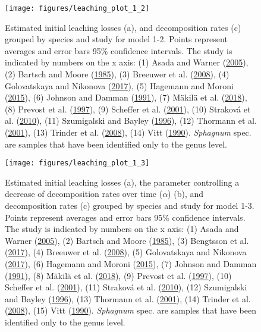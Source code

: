 \documentclass[
  12pt,
]{article}
\begin{document}
\begin{figure}[H]

{\centering \texttt{[image: figures/leaching\_plot\_1\_2]} 

}

\caption{Estimated initial leaching losses (a), and decomposition rates (c) grouped by species and study for model 1-2. Points represent averages and error bars 95\% confidence intervals. The study is indicated by numbers on the x axis: (1) Asada and Warner (\protect\hyperlink{ref-Asada.2005b}{2005}), (2) Bartsch and Moore (\protect\hyperlink{ref-Bartsch.1985}{1985}), (3) Breeuwer et al. (\protect\hyperlink{ref-Breeuwer.2008}{2008}), (4) Golovatskaya and Nikonova (\protect\hyperlink{ref-Golovatskaya.2017}{2017}), (5) Hagemann and Moroni (\protect\hyperlink{ref-Hagemann.2015}{2015}), (6) Johnson and Damman (\protect\hyperlink{ref-Johnson.1991}{1991}), (7) Mäkilä et al. (\protect\hyperlink{ref-Makila.2018}{2018}), (8) Prevost et al. (\protect\hyperlink{ref-Prevost.1997}{1997}), (9) Scheffer et al. (\protect\hyperlink{ref-Scheffer.2001}{2001}), (10) Straková et al. (\protect\hyperlink{ref-Strakova.2010}{2010}), (11) Szumigalski and Bayley (\protect\hyperlink{ref-Szumigalski.1996}{1996}), (12) Thormann et al. (\protect\hyperlink{ref-Thormann.2001}{2001}), (13) Trinder et al. (\protect\hyperlink{ref-Trinder.2008}{2008}), (14) Vitt (\protect\hyperlink{ref-Vitt.1990}{1990}). \emph{Sphagnum} spec. are samples that have been identified only to the genus level.}\label{fig:sup-out-mm-p5-1-2}
\end{figure}
\begin{figure}[H]

{\centering \texttt{[image: figures/leaching\_plot\_1\_3]} 

}

\caption{Estimated initial leaching losses (a), the parameter controlling a decrease of decomposition rates over time (\(\alpha\)) (b), and decomposition rates (c) grouped by species and study for model 1-3. Points represent averages and error bars 95\% confidence intervals. The study is indicated by numbers on the x axis: (1) Asada and Warner (\protect\hyperlink{ref-Asada.2005b}{2005}), (2) Bartsch and Moore (\protect\hyperlink{ref-Bartsch.1985}{1985}), (3) Bengtsson et al. (\protect\hyperlink{ref-Bengtsson.2017}{2017}), (4) Breeuwer et al. (\protect\hyperlink{ref-Breeuwer.2008}{2008}), (5) Golovatskaya and Nikonova (\protect\hyperlink{ref-Golovatskaya.2017}{2017}), (6) Hagemann and Moroni (\protect\hyperlink{ref-Hagemann.2015}{2015}), (7) Johnson and Damman (\protect\hyperlink{ref-Johnson.1991}{1991}), (8) Mäkilä et al. (\protect\hyperlink{ref-Makila.2018}{2018}), (9) Prevost et al. (\protect\hyperlink{ref-Prevost.1997}{1997}), (10) Scheffer et al. (\protect\hyperlink{ref-Scheffer.2001}{2001}), (11) Straková et al. (\protect\hyperlink{ref-Strakova.2010}{2010}), (12) Szumigalski and Bayley (\protect\hyperlink{ref-Szumigalski.1996}{1996}), (13) Thormann et al. (\protect\hyperlink{ref-Thormann.2001}{2001}), (14) Trinder et al. (\protect\hyperlink{ref-Trinder.2008}{2008}), (15) Vitt (\protect\hyperlink{ref-Vitt.1990}{1990}). \emph{Sphagnum} spec. are samples that have been identified only to the genus level.}\label{fig:sup-out-mm-p5-1-3}
\end{figure}
\end{document}
